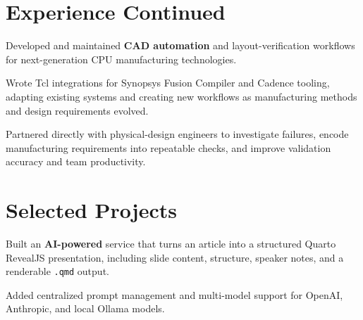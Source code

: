 \documentclass[]{plushcv}
\begin{document}
\newpage


\begin{minipage}[t]{0.70\textwidth}

\section{Experience Continued}

\vspace{\topsep}
\begin{tightemize}
  \sectionsep
  \item Developed and maintained \textbf{CAD automation} and layout-verification workflows for next-generation CPU manufacturing technologies.
  \item Wrote Tcl integrations for Synopsys Fusion Compiler and Cadence tooling, adapting existing systems and creating new workflows as manufacturing methods and design requirements evolved.
  \item Partnered directly with physical-design engineers to investigate failures, encode manufacturing requirements into repeatable checks, and improve validation accuracy and team productivity.
\end{tightemize}
\sectionsep

\section{Selected Projects}

\begin{tightemize}
  \sectionsep
  \item Built an \textbf{AI-powered} service that turns an article into a structured Quarto RevealJS presentation, including slide content, structure, speaker notes, and a renderable \texttt{.qmd} output.
  \item Added centralized prompt management and multi-model support for OpenAI, Anthropic, and local Ollama models.
\end{tightemize}
\sectionsep


\end{minipage}
\end{document}
